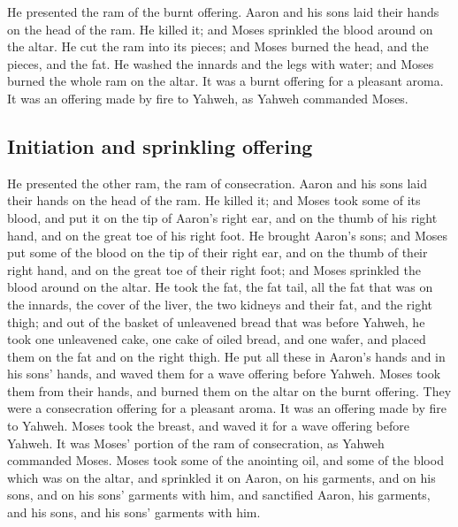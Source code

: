  He presented the ram of the burnt offering. Aaron and
his sons laid their hands on the head of the ram.  He
killed it; and Moses sprinkled the blood around on the altar.
 He cut the ram into its pieces; and Moses burned the
head, and the pieces, and the fat.  He washed the innards
and the legs with water; and Moses burned the whole ram on the altar. It
was a burnt offering for a pleasant aroma. It was an offering made by
fire to Yahweh, as Yahweh commanded Moses.

\hypertarget{initiation-and-sprinkling-offering}{%
\subsection{Initiation and sprinkling
offering}\label{initiation-and-sprinkling-offering}}

 He presented the other ram, the ram of consecration.
Aaron and his sons laid their hands on the head of the ram.
 He killed it; and Moses took some of its blood, and put
it on the tip of Aaron's right ear, and on the thumb of his right hand,
and on the great toe of his right foot.  He brought
Aaron's sons; and Moses put some of the blood on the tip of their right
ear, and on the thumb of their right hand, and on the great toe of their
right foot; and Moses sprinkled the blood around on the altar.
 He took the fat, the fat tail, all the fat that was on
the innards, the cover of the liver, the two kidneys and their fat, and
the right thigh;  and out of the basket of unleavened
bread that was before Yahweh, he took one unleavened cake, one cake of
oiled bread, and one wafer, and placed them on the fat and on the right
thigh.  He put all these in Aaron's hands and in his
sons' hands, and waved them for a wave offering before Yahweh.
 Moses took them from their hands, and burned them on the
altar on the burnt offering. They were a consecration offering for a
pleasant aroma. It was an offering made by fire to Yahweh.
 Moses took the breast, and waved it for a wave offering
before Yahweh. It was Moses' portion of the ram of consecration, as
Yahweh commanded Moses.  Moses took some of the anointing
oil, and some of the blood which was on the altar, and sprinkled it on
Aaron, on his garments, and on his sons, and on his sons' garments with
him, and sanctified Aaron, his garments, and his sons, and his sons'
garments with him.

